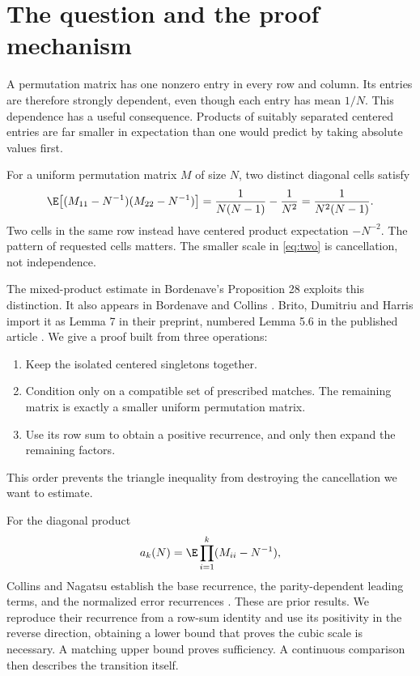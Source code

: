 \section{The question and the proof mechanism}

A permutation matrix has one nonzero entry in every row and column. Its entries are therefore strongly dependent, even though each entry has mean $1/N$. This dependence has a useful consequence. Products of suitably separated centered entries are far smaller in expectation than one would predict by taking absolute values first.

For a uniform permutation matrix $M$ of size $N$, two distinct diagonal cells satisfy
\begin{equation}\label{eq:two}
\E\bigl[(M_{11}-N^{-1})(M_{22}-N^{-1})\bigr]
=\frac{1}{N(N-1)}-\frac{1}{N^2}
=\frac{1}{N^2(N-1)}.
\end{equation}
Two cells in the same row instead have centered product expectation $-N^{-2}$. The pattern of requested cells matters. The smaller scale in \eqref{eq:two} is cancellation, not independence.

The mixed-product estimate in Bordenave's Proposition 28 \cite{Bordenave} exploits this distinction. It also appears in Bordenave and Collins \cite[Proposition 22]{BC}. Brito, Dumitriu and Harris import it as Lemma 7 in their preprint, numbered Lemma 5.6 in the published article \cite{BDH}. We give a proof built from three operations:
\begin{enumerate}
\item Keep the isolated centered singletons together.
\item Condition only on a compatible set of prescribed matches. The remaining matrix is exactly a smaller uniform permutation matrix.
\item Use its row sum to obtain a positive recurrence, and only then expand the remaining factors.
\end{enumerate}
This order prevents the triangle inequality from destroying the cancellation we want to estimate.

For the diagonal product
\[
a_k(N)=\E\prod_{i=1}^k(M_{ii}-N^{-1}),
\]
Collins and Nagatsu establish the base recurrence, the parity-dependent leading terms, and the normalized error recurrences \cite[Proposition 3.3]{CN}. These are prior results. We reproduce their recurrence from a row-sum identity and use its positivity in the reverse direction, obtaining a lower bound that proves the cubic scale is necessary. A matching upper bound proves sufficiency. A continuous comparison then describes the transition itself.

